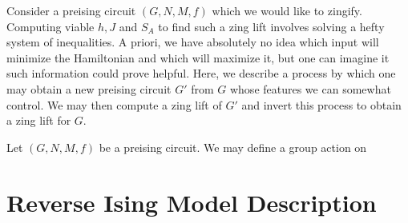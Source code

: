 Consider a preising circuit $(G,N,M,f)$ which we would like to zingify. Computing viable $h,J$ and $S_A$ to find such a zing lift involves solving a hefty system of inequalities. A priori, we have absolutely no idea which input will minimize the Hamiltonian and which will maximize it, but one can imagine it such information could prove helpful. Here, we describe a process by which one may obtain a new preising circuit $G'$ from $G$ whose features we can somewhat control. We may then compute a zing lift of $G'$ and invert this process to obtain a zing lift for $G$.

\begin{defn}\label{defn:spin-action}
	Let $(G,N,M,f)$ be a preising circuit. We may define a group action on 
\end{defn}
\section{Reverse Ising Model Description}



